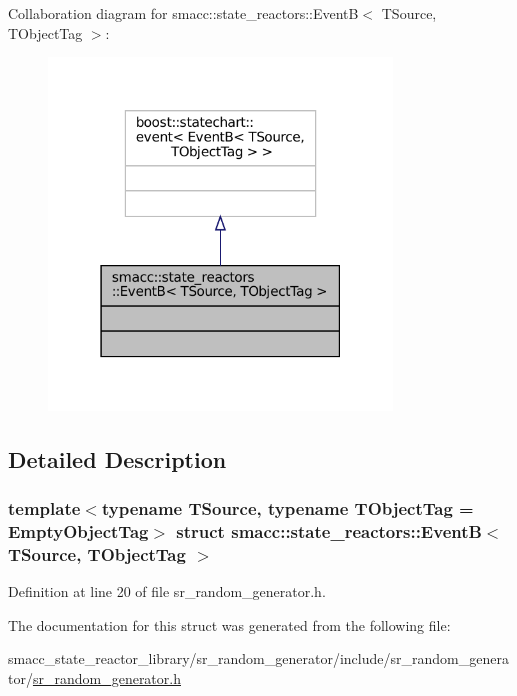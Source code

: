 Collaboration diagram for smacc\+:\+:state\+\_\+reactors\+:\+:EventB$<$ T\+Source, T\+Object\+Tag $>$\+:
\nopagebreak
\begin{figure}[H]
\begin{center}
\leavevmode
\includegraphics[width=259pt]{structsmacc_1_1state__reactors_1_1EventB__coll__graph}
\end{center}
\end{figure}


\subsection{Detailed Description}
\subsubsection*{template$<$typename T\+Source, typename T\+Object\+Tag = Empty\+Object\+Tag$>$\newline
struct smacc\+::state\+\_\+reactors\+::\+Event\+B$<$ T\+Source, T\+Object\+Tag $>$}



Definition at line 20 of file sr\+\_\+random\+\_\+generator.\+h.



The documentation for this struct was generated from the following file\+:\begin{DoxyCompactItemize}
\item 
smacc\+\_\+state\+\_\+reactor\+\_\+library/sr\+\_\+random\+\_\+generator/include/sr\+\_\+random\+\_\+generator/\hyperlink{sr__random__generator_8h}{sr\+\_\+random\+\_\+generator.\+h}\end{DoxyCompactItemize}

